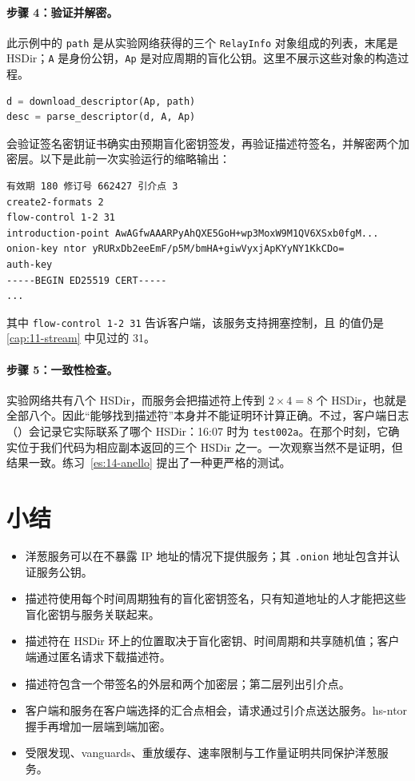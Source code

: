\paragraph{步骤 4：验证并解密。} 此示例中的 \texttt{path} 是从实验网络获得的三个 \texttt{RelayInfo} 对象组成的列表，末尾是 HSDir；\texttt{A} 是身份公钥，\texttt{Ap} 是对应周期的盲化公钥。这里不展示这些对象的构造过程。
\begin{lstlisting}[language=Python]
d = download_descriptor(Ap, path)
desc = parse_descriptor(d, A, Ap)
\end{lstlisting}
 会验证签名密钥证书确实由预期盲化密钥签发，再验证描述符签名，并解密两个加密层。以下是此前一次实验运行的缩略输出：
\begin{lstlisting}[numbers=none]
有效期 180 修订号 662427 引介点 3
create2-formats 2
flow-control 1-2 31
introduction-point AwAGfwAAARPyAhQXE5GoH+wp3MoxW9M1QV6XSxb0fgM...
onion-key ntor yRURxDb2eeEmF/p5M/bmHA+giwVyxjApKYyNY1KkCDo=
auth-key
-----BEGIN ED25519 CERT-----
...
\end{lstlisting}
其中 \texttt{flow-control 1-2 31} 告诉客户端，该服务支持拥塞控制，且  的值仍是 \cref{cap:11-stream} 中见过的 31。

\paragraph{步骤 5：一致性检查。}
实验网络共有八个 HSDir，而服务会把描述符上传到 $2\times4=8$ 个 HSDir，也就是全部八个。因此“能够找到描述符”本身并不能证明环计算正确。不过，客户端日志（）会记录它实际联系了哪个 HSDir：16:07 时为 \texttt{test002a}。在那个时刻，它确实位于我们代码为相应副本返回的三个 HSDir 之一。一次观察当然不是证明，但结果一致。练习~\ref{es:14-anello} 提出了一种更严格的测试。

\section*{小结}
\begin{itemize}
  \item 洋葱服务可以在不暴露 IP 地址的情况下提供服务；其 \texttt{.onion} 地址包含并认证服务公钥。
  \item 描述符使用每个时间周期独有的盲化密钥签名，只有知道地址的人才能把这些盲化密钥与服务关联起来。
  \item 描述符在 HSDir 环上的位置取决于盲化密钥、时间周期和共享随机值；客户端通过匿名请求下载描述符。
  \item 描述符包含一个带签名的外层和两个加密层；第二层列出引介点。
  \item 客户端和服务在客户端选择的汇合点相会，请求通过引介点送达服务。hs-ntor 握手再增加一层端到端加密。
  \item 受限发现、vanguards、重放缓存、速率限制与工作量证明共同保护洋葱服务。
\end{itemize}

